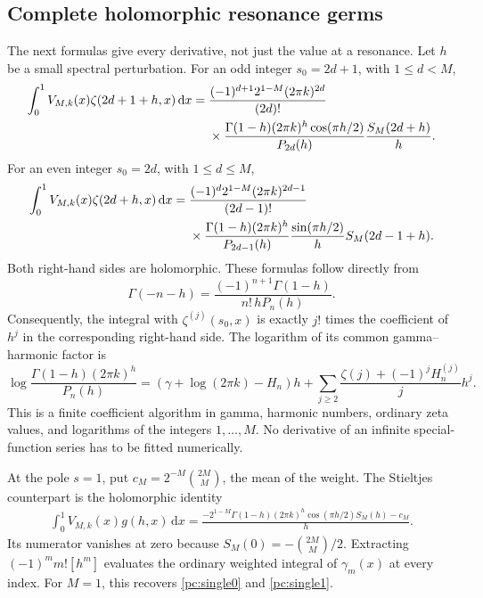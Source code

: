 \documentclass[11pt,a4paper]{article}
\numberwithin{equation}{section}
\theoremstyle{definition}
\newcommand{\dd}{\,\mathrm dx}
\begin{document}
\subsection{Complete holomorphic resonance germs}
The next formulas give every derivative, not just the value at a resonance. Let $h$ be a small spectral perturbation.
For an odd integer $s_0=2d+1$, with $1\le d<M$,
\begin{align}\label{pc:oddgerm}
 \int_0^1V_{M,k}(x)\zeta(2d+1+h,x)\dd
 ={}&\frac{(-1)^{d+1}2^{1-M}(2\pi k)^{2d}}{(2d)!}\notag\\
 &\times\frac{\Gamma(1-h)(2\pi k)^h\cos(\pi h/2)}{P_{2d}(h)}
             \frac{S_M(2d+h)}h.
\end{align}
For an even integer $s_0=2d$, with $1\le d\le M$,
\begin{align}\label{pc:evengerm}
 \int_0^1V_{M,k}(x)\zeta(2d+h,x)\dd
 ={}&\frac{(-1)^d2^{1-M}(2\pi k)^{2d-1}}{(2d-1)!}\notag\\
 &\times\frac{\Gamma(1-h)(2\pi k)^h}{P_{2d-1}(h)}
          \frac{\sin(\pi h/2)}h S_M(2d-1+h).
\end{align}
Both right-hand sides are holomorphic. These formulas follow directly from
\[
 \Gamma(-n-h)=\frac{(-1)^{n+1}\Gamma(1-h)}{n!\,hP_n(h)}.
\]
Consequently, the integral with $\zeta^{(j)}(s_0,x)$ is exactly $j!$ times the coefficient of $h^j$ in the corresponding right-hand side. The logarithm of its common gamma--harmonic factor is
\begin{equation}\label{pc:jetfactor}
 \log\frac{\Gamma(1-h)(2\pi k)^h}{P_n(h)}
 =(\gamma+\log(2\pi k)-H_n)h
 +\sum_{j\ge2}\frac{\zeta(j)+(-1)^jH_n^{(j)}}j h^j.
\end{equation}
This is a finite coefficient algorithm in gamma, harmonic numbers, ordinary zeta values, and logarithms of the integers $1,\ldots,M$. No derivative of an infinite special-function series has to be fitted numerically.

At the pole $s=1$, put $c_M=2^{-M}\binom{2M}{M}$, the mean of the weight. The Stieltjes counterpart is the holomorphic identity
\begin{align}\label{pc:stieltjesweightedgerm}
 \int_0^1V_{M,k}(x)g(h,x)\dd
 =\frac{-2^{1-M}\Gamma(1-h)(2\pi k)^h\cos(\pi h/2)S_M(h)-c_M}{h}.
\end{align}
Its numerator vanishes at zero because $S_M(0)=-\binom{2M}{M}/2$. Extracting $(-1)^m m![h^m]$ evaluates the ordinary weighted integral of $\gamma_m(x)$ at every index. For $M=1$, this recovers \eqref{pc:single0} and \eqref{pc:single1}.
\end{document}
